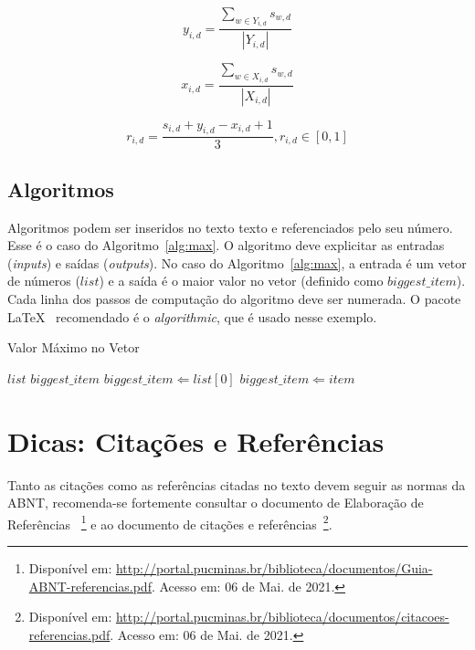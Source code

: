\documentclass[a4paper,12pt]{article}
\begin{document}
	\begin{equation}
		\label{eq:aid}
		y_{i,d}=\frac{\displaystyle\sum_{w\in Y_{i,d}}s_{w,d}}{|Y_{i,d}|}
	\end{equation}
	
	\begin{equation}
		\label{eq:bid}
		x_{i,d}=\frac{\displaystyle\sum_{w\in X_{i,d}}s_{w,d}}{|X_{i,d}|}
	\end{equation}
	
	\begin{equation}
		\label{eq:qscore}
		r_{i,d} = \frac{s_{i,d} + y_{i,d}-x_{i,d} + 1}{3}, r_{i,d}\in[0,1]
	\end{equation}
	
	\subsection{Algoritmos}
	
	Algoritmos podem ser inseridos no texto texto e referenciados pelo seu número. Esse é o caso do Algoritmo~\ref{alg:max}. O algoritmo deve explicitar as entradas (\textit{inputs}) e saídas (\textit{outputs}). No caso do Algoritmo~\ref{alg:max}, a entrada é um vetor de números ($list$) e a saída é o maior valor no vetor (definido como $biggest\_item$). Cada linha dos passos de computação do algoritmo deve ser numerada. O pacote \LaTeX~ recomendado é o \textit{algorithmic}, que é usado nesse exemplo.
	
	\begin{algorithm}
		\caption{Valor Máximo no Vetor}
		\label{alg:max}
		\begin{algorithmic}[1]
			\REQUIRE $list$
			\ENSURE $biggest\_item$
			\STATE $biggest\_item \Leftarrow list[0]$
			\STATE $biggest\_item \Leftarrow item$
			\ENDIF
			\ENDFOR
		\end{algorithmic}
	\end{algorithm}
	
	\section{Dicas: Citações e Referências}
	\label{sec:ref}
	
	Tanto as citações como as referências citadas no texto devem seguir as normas da ABNT, recomenda-se fortemente consultar o documento de Elaboração de Referências~\cite{manualpucref} \footnote{Disponível em: \url{http://portal.pucminas.br/biblioteca/documentos/Guia-ABNT-referencias.pdf}. Acesso em: 06 de Mai. de 2021.} e ao documento de citações e referências~\cite{manualpuccit}\footnote{Disponível em: \url{http://portal.pucminas.br/biblioteca/documentos/citacoes-referencias.pdf}. Acesso em: 06 de Mai. de 2021.}.
	
\end{document}
